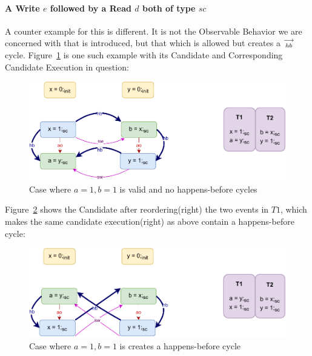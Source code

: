     \paragraph{A Write $e$ followed by a Read $d$ both of type $sc$}
        
        A counter example for this is different. 
        It is not the Observable Behavior we are concerned with that is introduced, but that which is allowed but creates a $\stackrel{\longrightarrow}{_{hb}}$ cycle. 
        Figure~\ref{reord_counter:example3(a)} is one such example with its Candidate and Corresponding Candidate Execution in question:
        \begin{figure}[H]
            \centering
            \includegraphics[scale=0.7]{4.InstructionReordering/4.ValidReorderingCandidate/Example5(Wsc-Rsc).pdf}
            \caption{Case where $a = 1, b = 1$ is valid and no happens-before cycles}
            \label{reord_counter:example3(a)}
        \end{figure}

        Figure~\ref{reord_counter:example3(b)} shows the Candidate after reordering(right) the two events in $T1$, which makes the same candidate execution(right) as above contain a happens-before cycle:
        \begin{figure}[H]
            \centering
            \includegraphics[scale=0.7]{4.InstructionReordering/4.ValidReorderingCandidate/Example5R(Wsc-Rsc).pdf}
            \caption{Case where $a = 1, b = 1$ is creates a happens-before cycle}
            \label{reord_counter:example3(b)}
        \end{figure}

